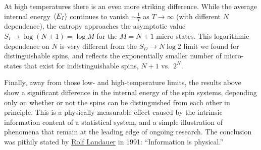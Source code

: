 At high temperatures there is an even more striking difference.
While the average internal energy $\left\langle E_I \right\rangle$ continues to vanish $\sim$$\frac{1}{T}$ as $T \to \infty$ (with different $N$ dependence), the entropy approaches the asymptotic value $S_I \to \log\left(N + 1\right) = \log M$ for the $M = N + 1$ micro-states.
This logarithmic dependence on $N$ is very different from the $S_D \to N\log 2$ limit we found for distinguishable spins, and reflects the exponentially smaller number of micro-states that exist for indistinguishable spins, $N + 1$ vs.\ $2^N$.

Finally, away from those low- and high-temperature limits, the results above show a significant difference in the internal energy of the spin systems, depending only on whether or not the spins can be distinguished from each other in principle.
This is a physically measurable effect caused by the intrinsic information content of a statistical system, and a simple illustration of phenomena that remain at the leading edge of ongoing research.
The conclusion was pithily stated by \href{https://en.wikipedia.org/wiki/Rolf_Landauer}{Rolf Landauer} in 1991: ``Information is physical.''
